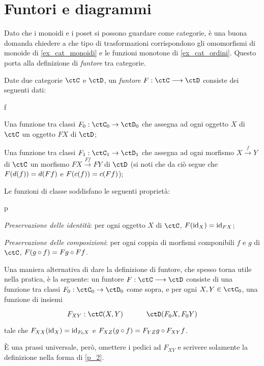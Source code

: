 \section{Funtori e diagrammi}\label{sec_funtori}
Dato che i monoidi e i poset si possono guardare come categorie, è una buona domanda chiedere a che tipo di trasformazioni corrispondono gli omomorfismi di monoide di \ref{ex_cat_monoidi} e le funzioni monotone di \ref{ex_cat_ordini}. Questo porta alla definizione di \emph{funtore} tra categorie.
\begin{definition}[Funtore]\label{def_funtore}
	Date due categorie \(\ctC\) e \(\ctD\), un \emph{funtore} \(F:\ctC\fun\ctD\) consiste dei seguenti dati:
	\begin{enumtag}{f}
		\item \label{f_1} Una funzione tra classi \(F_0 : \ctC_0\to\ctD_0\) che assegna ad ogni oggetto \(X\) di \(\ctC\) un oggetto \(FX\) di \(\ctD\);
		\item \label{f_2} Una funzione tra classi \(F_1 : \ctC_1\to\ctD_1\) che assegna ad ogni morfismo \(X \xrightarrow{f} Y\) di \(\ctC\) un morfismo \(FX \xrightarrow{Ff} FY\) di \(\ctD\) (si noti che da ciò segue che \(F(d(f))=d(Ff)\) e \(F(c(f))=c(Ff)\));
	\end{enumtag}
	Le funzioni di classe soddisfano le seguenti proprietà:
	\begin{enumtag}{p}
		\item \label{p_1} \emph{Preservazione delle identità}: per ogni oggetto \(X\) di \(\ctC\), \(F(\mathrm{id}_X)=\mathrm{id}_{FX}\);
		\item \label{p_2} \emph{Preservazione delle composizioni}: per ogni coppia di morfismi componibili \(f\) e \(g\) di \(\ctC\), \(F(g\circ f)=Fg\circ Ff\).
	\end{enumtag}
\end{definition}
\begin{remark}\label{def_alternativa_funtore}
	Una maniera alternativa di dare la definizione di funtore, che spesso torna utile nella pratica, è la seguente: un funtore \(F : \ctC\fun\ctD\) consiste di una funzione tra classi \(F_0 : \ctC_0\to \ctD_0\) come sopra, e per ogni \(X,Y\in\ctC_0\), una funzione di insiemi
	\[\begin{tikzcd}
			F_{XY} : \Hom{\ctC}(X,Y) & \Hom{\ctD}(F_0X,F_0Y)
		\end{tikzcd}
	\]
	tale che \(F_{XX}(\mathrm{id}_X) = \mathrm{id}_{F_0X}\) e \(F_{XZ}(g\circ f) = F_{YZ}g\circ F_{XY}f\).

	\`E una prassi universale, però, omettere i pedici ad \(F_{XY}\) e scrivere solamente la definizione nella forma di \ref{p_2}.
\end{remark}
